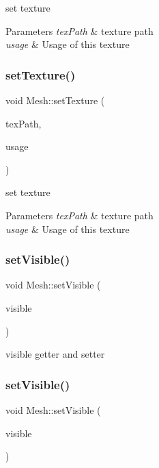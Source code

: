 set texture 
\begin{DoxyParams}{Parameters}
{\em tex\+Path} & texture path \\
\hline
{\em usage} & Usage of this texture \\
\hline
\end{DoxyParams}
\mbox{\label{classMesh_ac5afa042166c9f976551fb638611eb12}} 
\subsubsection{\texorpdfstring{set\+Texture()}{setTexture()}\hspace{0.1cm}{\footnotesize\ttfamily [8/8]}}
{\footnotesize\ttfamily void Mesh\+::set\+Texture (\begin{DoxyParamCaption}\item[{const std\+::string \&}]{tex\+Path,  }\item[{N\+Texture\+Data\+::\+Usage}]{usage }\end{DoxyParamCaption})}

set texture 
\begin{DoxyParams}{Parameters}
{\em tex\+Path} & texture path \\
\hline
{\em usage} & Usage of this texture \\
\hline
\end{DoxyParams}
\mbox{\label{classMesh_a4b1d195f81afe1429d5fdffeaab2a25b}} 
\subsubsection{\texorpdfstring{set\+Visible()}{setVisible()}\hspace{0.1cm}{\footnotesize\ttfamily [1/2]}}
{\footnotesize\ttfamily void Mesh\+::set\+Visible (\begin{DoxyParamCaption}\item[{bool}]{visible }\end{DoxyParamCaption})}

visible getter and setter \mbox{\label{classMesh_a4b1d195f81afe1429d5fdffeaab2a25b}} 
\subsubsection{\texorpdfstring{set\+Visible()}{setVisible()}\hspace{0.1cm}{\footnotesize\ttfamily [2/2]}}
{\footnotesize\ttfamily void Mesh\+::set\+Visible (\begin{DoxyParamCaption}\item[{bool}]{visible }\end{DoxyParamCaption})}

